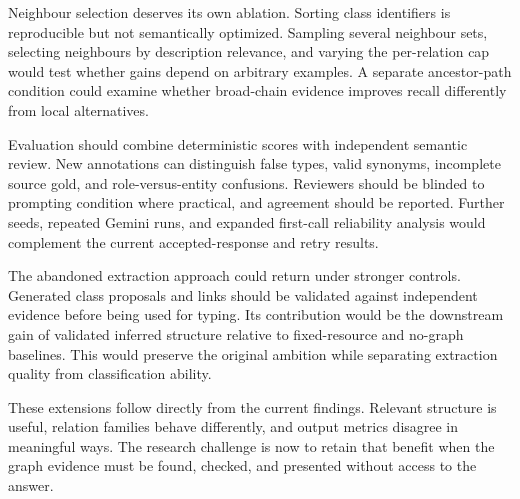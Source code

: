 Neighbour selection deserves its own ablation. Sorting class identifiers is reproducible but not semantically optimized. Sampling several neighbour sets, selecting neighbours by description relevance, and varying the per-relation cap would test whether gains depend on arbitrary examples. A separate ancestor-path condition could examine whether broad-chain evidence improves recall differently from local alternatives.


Evaluation should combine deterministic scores with independent semantic review. New annotations can distinguish false types, valid synonyms, incomplete source gold, and role-versus-entity confusions. Reviewers should be blinded to prompting condition where practical, and agreement should be reported. Further seeds, repeated Gemini runs, and expanded first-call reliability analysis would complement the current accepted-response and retry results.


The abandoned extraction approach could return under stronger controls. Generated class proposals and links should be validated against independent evidence before being used for typing. Its contribution would be the downstream gain of validated inferred structure relative to fixed-resource and no-graph baselines. This would preserve the original ambition while separating extraction quality from classification ability.


These extensions follow directly from the current findings. Relevant structure is useful, relation families behave differently, and output metrics disagree in meaningful ways. The research challenge is now to retain that benefit when the graph evidence must be found, checked, and presented without access to the answer.

